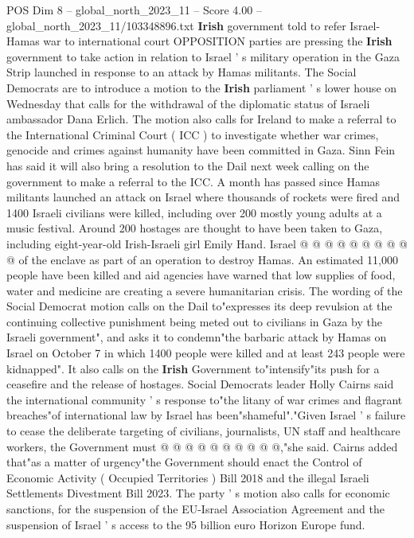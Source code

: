 \begin{textsample}{POS Dim 8 – global\_north\_2023\_11 – Score 4.00 – global\_north\_2023\_11/103348896.txt}  \label{ex:f8_pos_189}
\textbf{Irish} government told to refer Israel-Hamas war to international court OPPOSITION parties are pressing the \textbf{Irish} government to take action in relation to Israel ' s military operation in the Gaza Strip launched in response to an attack by Hamas militants.
The Social Democrats are to introduce a motion to the \textbf{Irish} parliament ' s lower house on Wednesday that calls for the withdrawal of the diplomatic status of Israeli ambassador Dana Erlich.
The motion also calls for Ireland to make a referral to the International Criminal Court ( ICC ) to investigate whether war crimes, genocide and crimes against humanity have been committed in Gaza.
Sinn Fein has said it will also bring a resolution to the Dail next week calling on the government to make a referral to the ICC.
A month has passed since Hamas militants launched an attack on Israel where thousands of rockets were fired and 1400 Israeli civilians were killed, including over 200 mostly young adults at a music festival.
Around 200 hostages are thought to have been taken to Gaza, including eight-year-old Irish-Israeli girl Emily Hand.
Israel @ @ @ @ @ @ @ @ @ @ of the enclave as part of an operation to destroy Hamas.
An estimated 11,000 people have been killed and aid agencies have warned that low supplies of food, water and medicine are creating a severe humanitarian crisis.
The wording of the Social Democrat motion calls on the Dail to"expresses its deep revulsion at the continuing collective punishment being meted out to civilians in Gaza by the Israeli government", and asks it to condemn"the barbaric attack by Hamas on Israel on October 7 in which 1400 people were killed and at least 243 people were kidnapped".
It also calls on the \textbf{Irish} Government to"intensify"its push for a ceasefire and the release of hostages.
Social Democrats leader Holly Cairns said the international community ' s response to"the litany of war crimes and flagrant breaches"of international law by Israel has been"shameful"."Given Israel ' s failure to cease the deliberate targeting of civilians, journalists, UN staff and healthcare workers, the Government must @ @ @ @ @ @ @ @ @ @,"she said.
Cairns added that"as a matter of urgency"the Government should enact the Control of Economic Activity ( Occupied Territories ) Bill 2018 and the illegal Israeli Settlements Divestment Bill 2023.
The party ' s motion also calls for economic sanctions, for the suspension of the EU-Israel Association Agreement and the suspension of Israel ' s access to the 95 billion euro Horizon Europe fund.

\end{textsample}
